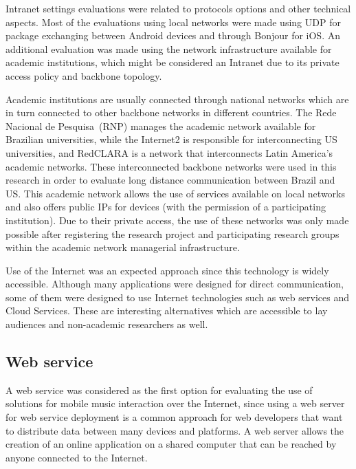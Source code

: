 Intranet settings evaluations were related to protocols options and other technical aspects.
Most of the evaluations using local networks were made using UDP for package exchanging between Android devices and through Bonjour for iOS.
An additional evaluation was made using the network infrastructure available for academic institutions, which might be considered an Intranet due to its private access policy and backbone topology.

Academic institutions are usually connected through national networks which are in turn connected to other backbone networks in different countries.
The Rede Nacional de Pesquisa~(RNP) manages the academic network available for Brazilian universities, while the Internet2 is responsible for interconnecting US universities, and RedCLARA is a network that interconnects Latin America's academic networks.
These interconnected backbone networks were used in this research in order to evaluate long distance communication between Brazil and US.
This academic network allows the use of services available on local networks and also offers public IPs for devices (with the permission of a participating institution).
Due to their private access, the use of these networks was only made possible after registering the research project and participating research groups within the academic network managerial infrastructure.

Use of the Internet was an expected approach since this technology is widely accessible.
Although many applications were designed for direct communication, some of them were designed to use Internet technologies such as web services and Cloud Services. These are interesting alternatives which are accessible to lay audiences and non-academic researchers as well.

\subsection*{Web service}
 
A web service was considered as the first option for evaluating the use of solutions for mobile music interaction over the Internet, since
using a web server for web service deployment is a common approach for web developers that want to distribute data between many devices and platforms.
A web server allows the creation of an online application on a shared computer that can be reached by anyone connected to the Internet.

